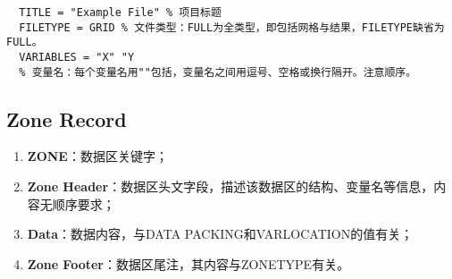\documentclass[lang=cn,11pt,a4paper]{elegantpaper}
\begin{document}
\begin{lstlisting}
  TITLE = "Example File" % 项目标题
  FILETYPE = GRID % 文件类型：FULL为全类型，即包括网格与结果，FILETYPE缺省为FULL。
  VARIABLES = "X" "Y
  % 变量名：每个变量名用""包括，变量名之间用逗号、空格或换行隔开。注意顺序。
\end{lstlisting}

\subsection{Zone Record}\label{zoneRecord}
\begin{enumerate}
  \item \textbf{ZONE}：数据区关键字；
  \item \textbf{Zone Header}：数据区头文字段，描述该数据区的结构、变量名等信息，内容无顺序要求；
  \item \textbf{Data}：数据内容，与DATA PACKING和VARLOCATION的值有关；
  \item \textbf{Zone Footer}：数据区尾注，其内容与ZONETYPE有关。
\end{enumerate}
\end{document}
